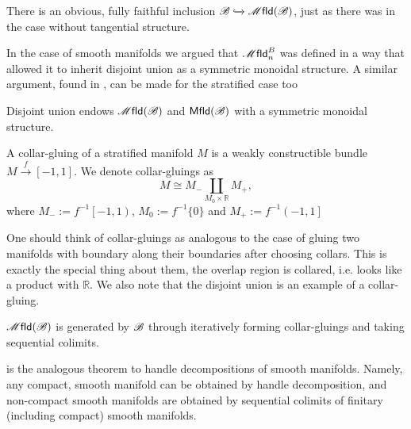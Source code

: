 \documentclass[../text]{subfiles}
\begin{document}
\begin{remark}
    There is an obvious, fully faithful inclusion $\bstr \xhookrightarrow{} \mfld(\bstr)$, just as there was in the case without tangential structure.
\end{remark}

In the case of smooth manifolds we argued that $\mfld_n^B$ was defined in a way that allowed it to inherit disjoint union as a symmetric monoidal structure. A similar argument, found in \cite{aft_fhstrat}, can be made for the stratified case too 

\begin{proposition}
    Disjoint union endows $\mfld(\bstr)$ and $\mfld[r](\bstr)$ with a symmetric monoidal structure.
\end{proposition}

\begin{definition}\label{def:collar-gluing}
    A collar-gluing of a stratified manifold $M$ is a weakly constructible bundle $M \xrightarrow{f} [-1,1]$. We denote collar-gluings as
    \begin{equation}
        M \cong M_- \coprod_{M_0 \times \mathbb{R}} M_+,
    \end{equation}
    where $M_- := f^{-1}\left[ -1, 1 \right)$, $M_0 := f^{-1}\{0\}$ and $M_+ := f^{-1} \left( -1, 1 \right]$
\end{definition}

\begin{remark}
    One should think of collar-gluings as analogous to the case of gluing two manifolds with boundary along their boundaries after choosing collars. This is exactly the special thing about them, the overlap region is collared, i.e. looks like a product with $\mathbb{R}$. We also note that the disjoint union is an example of a collar-gluing.
\end{remark}

\begin{theorem}\label{thm:decom_strat_man}
    $\mfld(\bstr)$ is generated by $\mathscr{B}$ through iteratively forming collar-gluings and taking sequential colimits.
\end{theorem}

\begin{remark}
     is the analogous theorem to handle decompositions of smooth manifolds. Namely, any compact, smooth manifold can be obtained by handle decomposition, and non-compact smooth manifolds are obtained by sequential colimits of finitary (including compact) smooth manifolds.
\end{remark}
\end{document}
